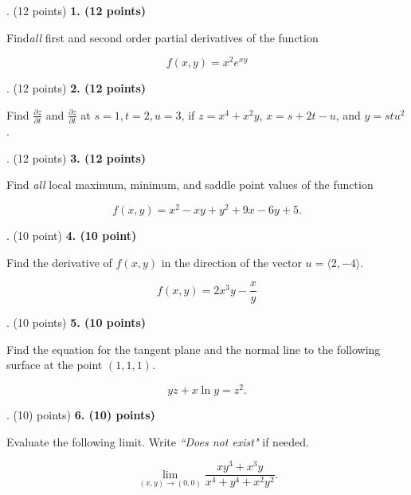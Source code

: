 \documentclass[12pt]{article}
\makeatletter
\newenvironment{problem}[1][]{%
  \bigskip%
  \noindent\begin{boxedminipage}{\columnwidth}%
  \def\@tempa{#1}%
  \ifx\@tempa\empty\else%
    \textbf{#1}\hspace{0.5em}%
  \fi%
}{%
  \end{boxedminipage}%
}
\makeatother
\begin{document}
\newpage
\begin{problem}[1. (12 points)]
Find\emph{all} first and second order partial derivatives of the function

\begin{equation*}
    f(x,y) = x^2e^{xy}
\end{equation*}
\end{problem}


\newpage
\begin{problem}[2. (12 points)]
Find $\frac{\partial z}{\partial t}$ and $\frac{\partial z}{\partial t}$ at $s=1, t=2,u=3$, if $z = x^4+x^2y$, $x=s+2t-u$, and $y=stu^2$.
\end{problem}



\newpage
\begin{problem}[3. (12 points)]
Find \emph{all} local maximum, minimum, and saddle point values of the function

\begin{equation*}
    f(x,y)=x^2-xy+y^2+9x-6y+5.
\end{equation*}
\end{problem}


\newpage
\begin{problem}[4. (10 point)]
Find the derivative of $f(x,y)$ in the direction of the vector $u = \langle 2,-4\rangle$.

\begin{equation*}
    f(x,y) = 2x^3y-\frac{x}{y}
\end{equation*}
\end{problem}




\newpage
\begin{problem}[5. (10 points)]
Find the equation for the tangent plane and the normal line to the following surface at the point $(1,1,1)$.

\begin{equation*}
    yz + x\ln{y} = z^2.
\end{equation*}
\end{problem}


\newpage
\begin{problem}[6. (10) points)]
Evaluate the following limit. Write \emph{``Does not exist"} if needed.

\begin{equation*}
    \lim_{(x,y)\to (0,0)} \frac{xy^3+x^3y}{x^4+y^4+x^2y^2}.
\end{equation*}
\end{problem}
\end{document}

